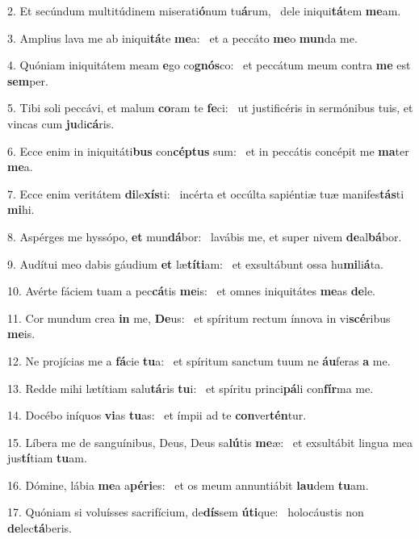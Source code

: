 2. Et secúndum multitúdinem miserati\textbf{ó}num tu\textbf{á}rum, \ast\  dele iniqui\textbf{tá}tem \textbf{me}am.\

3. Amplius lava me ab iniqui\textbf{tá}te \textbf{me}a: \ast\  et a peccáto \textbf{me}o \textbf{mun}da me.\

4. Quóniam iniquitátem meam \textbf{e}go co\textbf{gnós}co: \ast\  et peccátum meum contra \textbf{me} est \textbf{sem}per.\

5. Tibi soli peccávi, et malum \textbf{co}ram te \textbf{fe}ci: \ast\  ut justificéris in sermónibus tuis, et vincas cum \textbf{ju}di\textbf{cá}ris.\

6. Ecce enim in iniquitáti\textbf{bus} con\textbf{cép}\textbf{tus} sum: \ast\  et in peccátis concépit me \textbf{ma}ter \textbf{me}a.\

7. Ecce enim veritátem \textbf{di}le\textbf{xís}ti: \ast\  incérta et occúlta sapiéntiæ tuæ manifes\textbf{tás}ti \textbf{mi}hi.\

8. Aspérges me hyssópo, \textbf{et} mun\textbf{dá}bor: \ast\  lavábis me, et super nivem \textbf{de}al\textbf{bá}bor.\

9. Audítui meo dabis gáudium \textbf{et} læ\textbf{tí}\textbf{ti}am: \ast\  et exsultábunt ossa hu\textbf{mi}li\textbf{á}ta.\

10. Avérte fáciem tuam a pec\textbf{cá}tis \textbf{me}is: \ast\  et omnes iniquitátes \textbf{me}as \textbf{de}le.\

11. Cor mundum crea \textbf{in} me, \textbf{De}us: \ast\  et spíritum rectum ínnova in vi\textbf{scé}ribus \textbf{me}is.\

12. Ne projícias me a \textbf{fá}cie \textbf{tu}a: \ast\  et spíritum sanctum tuum ne \textbf{áu}feras \textbf{a} me.\

13. Redde mihi lætítiam salu\textbf{tá}ris \textbf{tu}i: \ast\  et spíritu princi\textbf{pá}li con\textbf{fír}ma me.\

14. Docébo iníquos \textbf{vi}as \textbf{tu}as: \ast\  et ímpii ad te \textbf{con}ver\textbf{tén}tur.\

15. Líbera me de sanguínibus, Deus, Deus sa\textbf{lú}tis \textbf{me}æ: \ast\  et exsultábit lingua mea jus\textbf{tí}tiam \textbf{tu}am.\

16. Dómine, lábia \textbf{me}a a\textbf{pé}\textbf{ri}es: \ast\  et os meum annuntiábit \textbf{lau}dem \textbf{tu}am.\

17. Quóniam si voluísses sacrifícium, de\textbf{dís}sem \textbf{ú}\textbf{ti}que: \ast\  holocáustis non \textbf{de}lec\textbf{tá}beris.\

